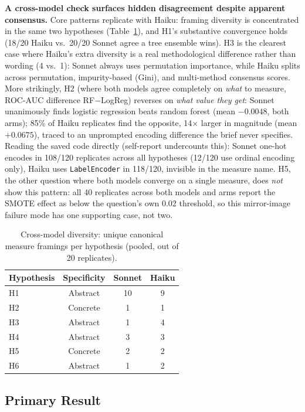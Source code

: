 \documentclass{article}
\begin{document}
\textbf{A cross-model check surfaces hidden disagreement despite apparent
consensus.} Core patterns replicate with Haiku: framing diversity is concentrated in the
same two hypotheses (Table~\ref{tab:crossmodel}), and H1's substantive convergence holds
(18/20 Haiku vs.\ 20/20 Sonnet agree a tree ensemble wins). H3 is the clearest case where
Haiku's extra diversity is a real methodological difference rather than wording (4 vs.\ 1):
Sonnet always uses permutation importance, while Haiku splits across permutation,
impurity-based (Gini), and multi-method consensus scores. More strikingly,
H2 (where both models agree completely on \emph{what} to measure, ROC-AUC difference
RF$-$LogReg) reverses on \emph{what value they get}: Sonnet unanimously finds logistic
regression beats random forest (mean $-0.0048$, both arms); 85\% of Haiku replicates find
the opposite, 14$\times$ larger in magnitude (mean $+0.0675$), traced to an unprompted
encoding difference the brief never specifies. Reading the saved code directly (self-report
undercounts this): Sonnet one-hot encodes in 108/120 replicates across all hypotheses
(12/120 use ordinal encoding only), Haiku uses \texttt{LabelEncoder} in 118/120, invisible
in the measure name. H5, the other question
where both models converge on a single measure, does \emph{not} show this pattern: all 40
replicates across both models and arms report the SMOTE effect as below the question's own
0.02 threshold, so this mirror-image failure mode has one supporting case, not two.

\begin{table}[h]
  \caption{Cross-model diversity: unique canonical measure framings per hypothesis
  (pooled, out of 20 replicates).}
  \label{tab:crossmodel}
  \centering
  \small
  \begin{tabular}{lccc}
    \toprule
    Hypothesis & Specificity & Sonnet & Haiku \\
    \midrule
    H1 & Abstract & 10 & 9 \\
    H2 & Concrete & 1 & 1 \\
    H3 & Abstract & 1 & 4 \\
    H4 & Abstract & 3 & 3 \\
    H5 & Concrete & 2 & 2 \\
    H6 & Abstract & 1 & 2 \\
    \bottomrule
  \end{tabular}
\end{table}

\subsection{Primary Result}
\end{document}
